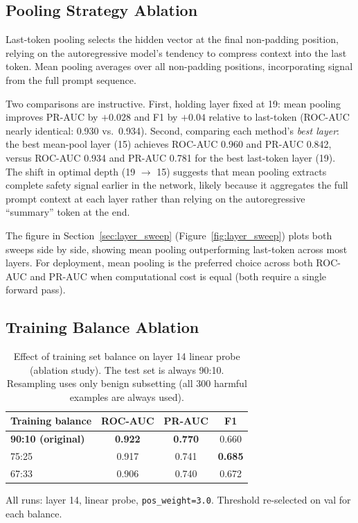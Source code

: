 \documentclass[11pt,a4paper]{article}
\begin{document}
\subsection{Pooling Strategy Ablation}
\label{sec:pooling}

Last-token pooling selects the hidden vector at the final non-padding position,
relying on the autoregressive model's tendency to compress context into the last
token. Mean pooling averages over all non-padding positions, incorporating signal
from the full prompt sequence.

Two comparisons are instructive. First, holding layer fixed at 19: mean pooling
improves PR-AUC by $+0.028$ and F1 by $+0.04$ relative to last-token (ROC-AUC
nearly identical: 0.930 vs.\ 0.934). Second, comparing each method's
\emph{best layer}: the best mean-pool layer (15) achieves ROC-AUC 0.960 and
PR-AUC 0.842, versus ROC-AUC 0.934 and PR-AUC 0.781 for the best last-token layer (19).
The shift in optimal depth (19 $\to$ 15) suggests that mean pooling extracts
complete safety signal earlier in the network, likely because it aggregates the
full prompt context at each layer rather than relying on the autoregressive
``summary'' token at the end.

The figure in Section~\ref{sec:layer_sweep} (Figure~\ref{fig:layer_sweep}) plots
both sweeps side by side, showing mean pooling outperforming last-token across
most layers. For deployment, mean pooling is the preferred choice across both
ROC-AUC and PR-AUC when computational cost is equal (both require a single
forward pass).

\subsection{Training Balance Ablation}

\begin{table}[H]
\centering
\caption{Effect of training set balance on layer 14 linear probe (ablation study).
         The test set is always 90:10. Resampling uses only benign subsetting
         (all 300 harmful examples are always used).}
\label{tab:balance}
\begin{tabular}{lccc}
\toprule
Training balance & ROC-AUC & PR-AUC & F1 \\
\midrule
\textbf{90:10 (original)} & \textbf{0.922} & \textbf{0.770} & 0.660 \\
75:25                     & 0.917          & 0.741          & \textbf{0.685} \\
67:33                     & 0.906          & 0.740          & 0.672 \\
\bottomrule
\end{tabular}
\vspace{0.2em}
\footnotesize{All runs: layer 14, linear probe, \texttt{pos\_weight=3.0}.
              Threshold re-selected on val for each balance.}
\end{table}
\end{document}
